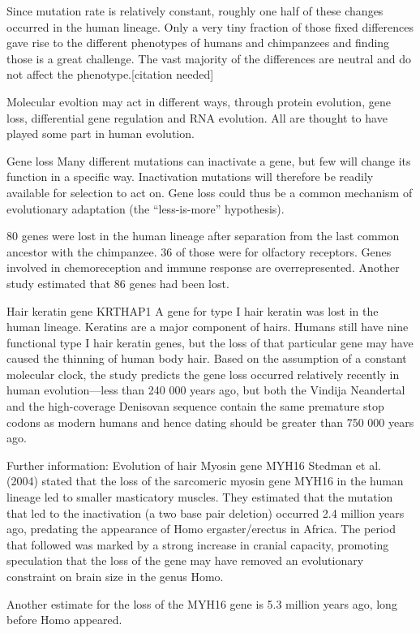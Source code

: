 Since mutation rate is relatively constant, roughly one half of these changes occurred in the human lineage. Only a very tiny fraction of those fixed differences gave rise to the different phenotypes of humans and chimpanzees and finding those is a great challenge. The vast majority of the differences are neutral and do not affect the phenotype.{[}citation needed{]}

Molecular evoltion may act in different ways, through protein evolution, gene loss, differential gene regulation and RNA evolution. All are thought to have played some part in human evolution.

Gene loss
Many different mutations can inactivate a gene, but few will change its function in a specific way. Inactivation mutations will therefore be readily available for selection to act on. Gene loss could thus be a common mechanism of evolutionary adaptation (the ``less-is-more'' hypothesis).

80 genes were lost in the human lineage after separation from the last common ancestor with the chimpanzee. 36 of those were for olfactory receptors. Genes involved in chemoreception and immune response are overrepresented. Another study estimated that 86 genes had been lost.

Hair keratin gene KRTHAP1
A gene for type I hair keratin was lost in the human lineage. Keratins are a major component of hairs. Humans still have nine functional type I hair keratin genes, but the loss of that particular gene may have caused the thinning of human body hair. Based on the assumption of a constant molecular clock, the study predicts the gene loss occurred relatively recently in human evolution---less than 240 000 years ago, but both the Vindija Neandertal and the high-coverage Denisovan sequence contain the same premature stop codons as modern humans and hence dating should be greater than 750 000 years ago.

Further information: Evolution of hair
Myosin gene MYH16
Stedman et al. (2004) stated that the loss of the sarcomeric myosin gene MYH16 in the human lineage led to smaller masticatory muscles. They estimated that the mutation that led to the inactivation (a two base pair deletion) occurred 2.4 million years ago, predating the appearance of Homo ergaster/erectus in Africa. The period that followed was marked by a strong increase in cranial capacity, promoting speculation that the loss of the gene may have removed an evolutionary constraint on brain size in the genus Homo.

Another estimate for the loss of the MYH16 gene is 5.3 million years ago, long before Homo appeared.

